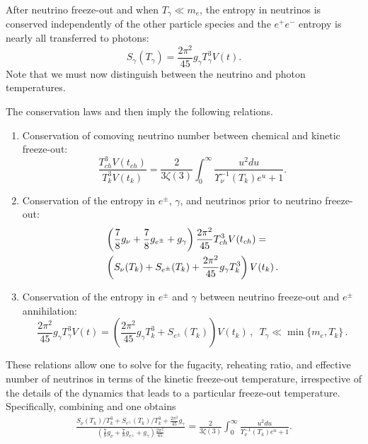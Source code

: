 After neutrino freeze-out and when $T_{\gamma}\ll m_e$, the entropy in neutrinos is conserved independently of the other particle species and the $e^+e^-$ entropy is nearly all transferred to photons:
\begin{equation}
S_{\gamma}(T_\gamma)=\frac{2 \pi^2}{45}g_\gamma T_{\gamma}^3 V(t).
\end{equation}
 Note that we must now distinguish between the neutrino and photon temperatures.

The conservation laws  and  then imply the following  relations.
\begin{enumerate}
\item Conservation of comoving neutrino number between chemical and kinetic freeze-out:
\begin{equation}\label{modindeq1}
\frac{T_{ch}^3V(t_{ch})}{T_k^3V(t_k)}=\frac{2}{3\zeta(3)}\int_0^\infty \frac{u^2 du}{\Upsilon_\nu^{-1}(T_k)e^u+1}.
\end{equation}
\item Conservation of the entropy in $e^\pm$, $\gamma$, and neutrinos prior to neutrino freeze-out:
\begin{align}\label{modindeq2}
&\left(\frac{7}{8}g_\nu+\frac{7}{8}g_{e^\pm} +g_\gamma \right)\frac{2\pi^2}{45} T_{ch}^3V(t_{ch})=\\
&\left(S_{\nu}(T_k)+S_{e^\pm}(T_k)+\frac{2\pi^2}{45}g_\gamma T_k^3\right)V(t_k)\,.\notag
\end{align}
\item Conservation of the entropy in $e^\pm$ and $\gamma$ between neutrino freeze-out and $e^\pm$ annihilation:
\begin{equation}\label{modindeq3}
\frac{2 \pi^2}{45}g_\gamma T_{\gamma}^3 V(t)=\left(\frac{2\pi^2}{45}g_\gamma T_k^3+S_{e^\pm}(T_k)\right)V(t_k)\,, \,\,\, T_\gamma\ll \min\{m_e, T_k\}\,.
\end{equation}
\end{enumerate}

These relations allow one to solve for the fugacity, reheating ratio, and effective number of neutrinos in terms of the kinetic freeze-out temperature, irrespective of the details of the dynamics that leads to a particular freeze-out temperature. Specifically, combining  and   one obtains
\begin{align}
   \frac{S_{\nu}(T_k)/T_k^3+S_{e^\pm}(T_k)/T_k^3+\frac{2\pi^2}{45}g_\gamma }{\left(\frac{7}{8}g_\nu+\frac{7}{8}g_{e^\pm} +g_\gamma \right)\frac{2\pi^2}{45} }=\frac{2}{3\zeta(3)}\int_0^\infty \frac{u^2 du}{\Upsilon_\nu^{-1}(T_k)e^u+1}.
\end{align}

